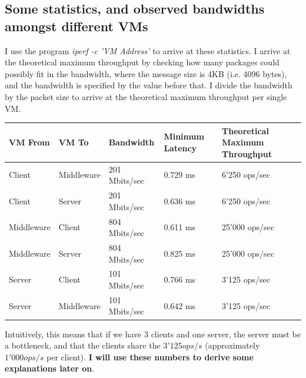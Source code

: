 \documentclass[11pt,a4paper]{article}
\begin{document}
\subsection{Some statistics, and observed bandwidths amongst different VMs}
I use the program \textit{iperf -c 'VM Address'} to arrive at these statistics.
I arrive at the theoretical maximum throughput by checking how many packages could possibly fit in the bandwidth, where the message size is 4KB (i.e. 4096 bytes), and the bandwidth is specified by the value before that.
I divide the bandwidth by the packet size to arrive at the theoretical maximum throughput per single VM.

\begin{center}
    \begin{tabular}{| l | l | l | l | l |}
    \hline
    VM From & VM To & Bandwidth & Minimum Latency & Theoretical Maximum Throughput \\ \hline
    Client & Middleware & 201 Mbits/sec & 0.729 ms &  6'250 ops/sec \\ \hline
    Client & Server & 201 Mbits/sec & 0.636 ms & 6'250 ops/sec \\ \hline
    Middleware & Client & 804 Mbits/sec & 0.611 ms & 25'000 ops/sec \\ \hline
    Middleware & Server & 804 Mbits/sec & 0.825 ms & 25'000 ops/sec \\ \hline
    Server & Client & 101 Mbits/sec & 0.766 ms &  3'125 ops/sec \\ \hline
    Server & Middleware & 101 Mbits/sec & 0.642 ms & 3'125 ops/sec \\
    \hline
    \end{tabular}
\end{center}

Intuitively, this means that if we have 3 clients and one server, the server must be a bottleneck, and that the clients share the $3'125 ops/s$ (approximately $1'000ops/s$ per client).
\textbf{I will use these numbers to derive some explanations later on}.\\
\end{document}
